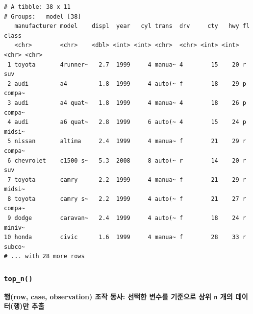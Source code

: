\documentclass[
  11pt,
]{krantz}
\makeatletter
\newenvironment{Shaded}{\begin{snugshade}}{\end{snugshade}}
\newcommand{\CommentTok}[1]{\textcolor[rgb]{0.37,0.37,0.37}{\textit{#1}}}
\newcommand{\DecValTok}[1]{\textcolor[rgb]{0.06,0.06,0.06}{#1}}
\newcommand{\KeywordTok}[1]{\textcolor[rgb]{0.27,0.27,0.27}{\textbf{#1}}}
\newcommand{\NormalTok}[1]{#1}
\newcommand{\OperatorTok}[1]{\textcolor[rgb]{0.43,0.43,0.43}{\textbf{#1}}}
\newcommand{\StringTok}[1]{\textcolor[rgb]{0.5,0.5,0.5}{#1}}
\newenvironment{kframe}{%
\medskip{}
\setlength{\fboxsep}{.8em}
 \def\at@end@of@kframe{}%
 \ifinner\ifhmode%
  \def\at@end@of@kframe{\end{minipage}}%
  \begin{minipage}{\columnwidth}%
 \fi\fi%
 \def\FrameCommand##1{\hskip\@totalleftmargin \hskip-\fboxsep
 \colorbox{shadecolor}{##1}\hskip-\fboxsep
     \hskip-\linewidth \hskip-\@totalleftmargin \hskip\columnwidth}%
 \MakeFramed {\advance\hsize-\width
   \@totalleftmargin\z@ \linewidth\hsize
   \@setminipage}}%
 {\par\unskip\endMakeFramed%
 \at@end@of@kframe}
\renewenvironment{quote}{\begin{kframe}}{\end{kframe}}
\makeatother
\begin{document}
\begin{Shaded}
\end{Shaded}

\begin{verbatim}
# A tibble: 38 x 11
# Groups:   model [38]
   manufacturer model    displ  year   cyl trans  drv     cty   hwy fl    class 
   <chr>        <chr>    <dbl> <int> <int> <chr>  <chr> <int> <int> <chr> <chr> 
 1 toyota       4runner~   2.7  1999     4 manua~ 4        15    20 r     suv   
 2 audi         a4         1.8  1999     4 auto(~ f        18    29 p     compa~
 3 audi         a4 quat~   1.8  1999     4 manua~ 4        18    26 p     compa~
 4 audi         a6 quat~   2.8  1999     6 auto(~ 4        15    24 p     midsi~
 5 nissan       altima     2.4  1999     4 manua~ f        21    29 r     compa~
 6 chevrolet    c1500 s~   5.3  2008     8 auto(~ r        14    20 r     suv   
 7 toyota       camry      2.2  1999     4 manua~ f        21    29 r     midsi~
 8 toyota       camry s~   2.2  1999     4 auto(~ f        21    27 r     compa~
 9 dodge        caravan~   2.4  1999     4 auto(~ f        18    24 r     miniv~
10 honda        civic      1.6  1999     4 manua~ f        28    33 r     subco~
# ... with 28 more rows
\end{verbatim}

\normalsize

\hypertarget{dplyr-topn}{%
\subsubsection*{\texorpdfstring{\texttt{top\_n()}}{top\_n()}}\label{dplyr-topn}}


\begin{quote}
\textbf{행(row, case, observation) 조작 동사: 선택한 변수를 기준으로 상위 \texttt{n} 개의 데이터(행)만 추출}
\end{quote}

\footnotesize
\end{document}

